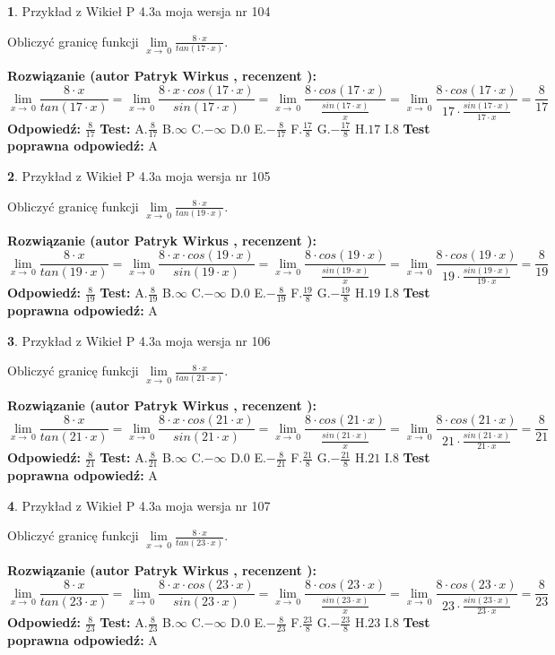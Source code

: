 \documentclass[12pt, a4paper]{article}
\theoremstyle{definition} %
\newtheorem{zad}{}
\newcommand{\zadStart}[1]{\begin{zad}#1\newline}
\newcommand{\zadStop}{\end{zad}}
\newcommand{\rozwStart}[2]{\noindent \textbf{Rozwiązanie (autor #1 , recenzent #2): }\newline}
\newcommand{\rozwStop}{\newline}
\newcommand{\odpStart}{\noindent \textbf{Odpowiedź:}\newline}
\newcommand{\odpStop}{\newline}
\newcommand{\testStart}{\noindent \textbf{Test:}\newline}
\newcommand{\testStop}{\newline}
\newcommand{\kluczStart}{\noindent \textbf{Test poprawna odpowiedź:}\newline}
\newcommand{\kluczStop}{\newline}
\begin{document}
\zadStart{Przykład z Wikieł P 4.3a moja wersja nr 104}


Obliczyć granicę funkcji $\lim\limits_{x\to\ 0}\frac{8 \cdot x}{tan(17 \cdot x)}$.
\zadStop
\rozwStart{Patryk Wirkus}{}
$$\lim\limits_{x\to\ 0}\frac{8 \cdot x}{tan(17 \cdot x)}=\lim\limits_{x\to\ 0}\frac{8 \cdot x \cdot cos(17 \cdot x)}{sin(17 \cdot x)}=\lim\limits_{x\to\ 0}\frac{8 \cdot cos(17 \cdot x)}{\frac{sin(17 \cdot x)}{x}}=\lim\limits_{x\to\ 0}\frac{8 \cdot cos(17 \cdot x)}{17 \cdot \frac{sin(17 \cdot x)}{17 \cdot x}} = \frac{8}{17}$$
\rozwStop
\odpStart
$\frac{8}{17}$
\odpStop
\testStart
A.$\frac{8}{17}$
B.$\infty$
C.$-\infty$
D.$0$
E.$-\frac{8}{17}$
F.$\frac{17}{8}$
G.$-\frac{17}{8}$
H.$17$
I.$8$
\testStop
\kluczStart
A
\kluczStop



\zadStart{Przykład z Wikieł P 4.3a moja wersja nr 105}


Obliczyć granicę funkcji $\lim\limits_{x\to\ 0}\frac{8 \cdot x}{tan(19 \cdot x)}$.
\zadStop
\rozwStart{Patryk Wirkus}{}
$$\lim\limits_{x\to\ 0}\frac{8 \cdot x}{tan(19 \cdot x)}=\lim\limits_{x\to\ 0}\frac{8 \cdot x \cdot cos(19 \cdot x)}{sin(19 \cdot x)}=\lim\limits_{x\to\ 0}\frac{8 \cdot cos(19 \cdot x)}{\frac{sin(19 \cdot x)}{x}}=\lim\limits_{x\to\ 0}\frac{8 \cdot cos(19 \cdot x)}{19 \cdot \frac{sin(19 \cdot x)}{19 \cdot x}} = \frac{8}{19}$$
\rozwStop
\odpStart
$\frac{8}{19}$
\odpStop
\testStart
A.$\frac{8}{19}$
B.$\infty$
C.$-\infty$
D.$0$
E.$-\frac{8}{19}$
F.$\frac{19}{8}$
G.$-\frac{19}{8}$
H.$19$
I.$8$
\testStop
\kluczStart
A
\kluczStop



\zadStart{Przykład z Wikieł P 4.3a moja wersja nr 106}


Obliczyć granicę funkcji $\lim\limits_{x\to\ 0}\frac{8 \cdot x}{tan(21 \cdot x)}$.
\zadStop
\rozwStart{Patryk Wirkus}{}
$$\lim\limits_{x\to\ 0}\frac{8 \cdot x}{tan(21 \cdot x)}=\lim\limits_{x\to\ 0}\frac{8 \cdot x \cdot cos(21 \cdot x)}{sin(21 \cdot x)}=\lim\limits_{x\to\ 0}\frac{8 \cdot cos(21 \cdot x)}{\frac{sin(21 \cdot x)}{x}}=\lim\limits_{x\to\ 0}\frac{8 \cdot cos(21 \cdot x)}{21 \cdot \frac{sin(21 \cdot x)}{21 \cdot x}} = \frac{8}{21}$$
\rozwStop
\odpStart
$\frac{8}{21}$
\odpStop
\testStart
A.$\frac{8}{21}$
B.$\infty$
C.$-\infty$
D.$0$
E.$-\frac{8}{21}$
F.$\frac{21}{8}$
G.$-\frac{21}{8}$
H.$21$
I.$8$
\testStop
\kluczStart
A
\kluczStop



\zadStart{Przykład z Wikieł P 4.3a moja wersja nr 107}


Obliczyć granicę funkcji $\lim\limits_{x\to\ 0}\frac{8 \cdot x}{tan(23 \cdot x)}$.
\zadStop
\rozwStart{Patryk Wirkus}{}
$$\lim\limits_{x\to\ 0}\frac{8 \cdot x}{tan(23 \cdot x)}=\lim\limits_{x\to\ 0}\frac{8 \cdot x \cdot cos(23 \cdot x)}{sin(23 \cdot x)}=\lim\limits_{x\to\ 0}\frac{8 \cdot cos(23 \cdot x)}{\frac{sin(23 \cdot x)}{x}}=\lim\limits_{x\to\ 0}\frac{8 \cdot cos(23 \cdot x)}{23 \cdot \frac{sin(23 \cdot x)}{23 \cdot x}} = \frac{8}{23}$$
\rozwStop
\odpStart
$\frac{8}{23}$
\odpStop
\testStart
A.$\frac{8}{23}$
B.$\infty$
C.$-\infty$
D.$0$
E.$-\frac{8}{23}$
F.$\frac{23}{8}$
G.$-\frac{23}{8}$
H.$23$
I.$8$
\testStop
\kluczStart
A
\kluczStop
\end{document}
